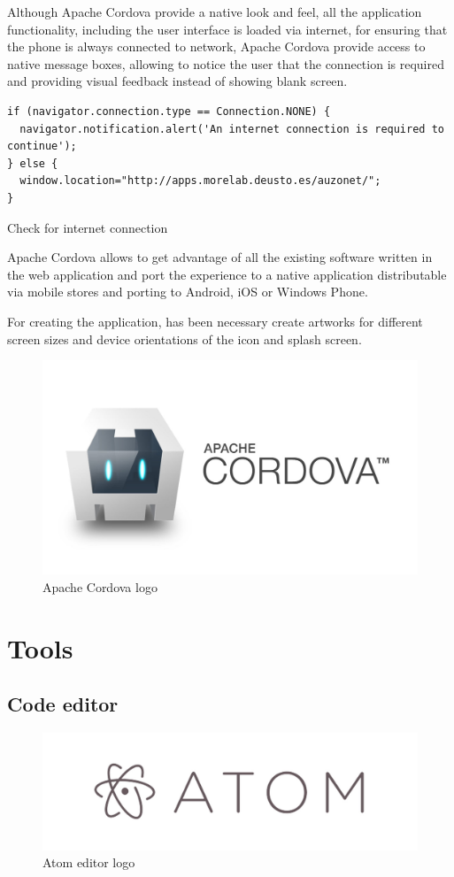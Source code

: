 \documentclass{DeustoFDP}
\begin{document}
Although Apache Cordova provide a native look and feel, all the application functionality, including the user interface is loaded via internet, for ensuring that the phone is always connected to network, Apache Cordova provide access to native message boxes, allowing to notice the user that the connection is required and providing visual feedback instead of showing blank screen.

\begin{listing}[!h]\centering 
	\begin{minipage}{.9\textwidth}
		\begin{verbatim}
if (navigator.connection.type == Connection.NONE) {
  navigator.notification.alert('An internet connection is required to continue');
} else {
  window.location="http://apps.morelab.deusto.es/auzonet/";
}
		\end{verbatim}
	\end{minipage}
	\caption{Check for internet connection}\label{lst:internetcheck}
\end{listing}

Apache Cordova \cite{Cordova} allows to get advantage of all the existing software written in the web application and port the experience to a native application distributable via mobile stores and porting to Android, iOS or Windows Phone.

For creating the application, has been necessary create artworks for different screen sizes and device orientations of the icon and splash screen.

\begin{figure}[h]
\centering
\includegraphics[width=0.4\linewidth]{fig/cordova}
\caption[Apache Cordova logo]{Apache Cordova logo}
\label{fig:cordova}
\end{figure}

\section{Tools}
\subsection{Code editor}
\begin{figure}[h]
\centering
\includegraphics[width=0.7\linewidth]{fig/atom}
\caption[Atom editor logo]{Atom editor logo}
\label{fig:atom}
\end{figure}
\end{document}
